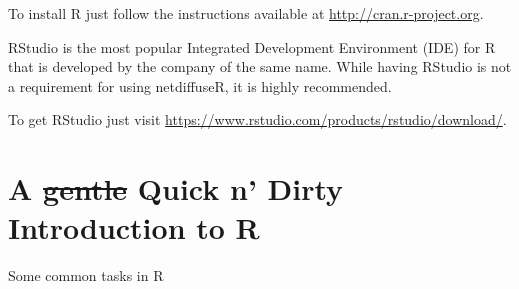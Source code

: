 \documentclass[]{book}
\begin{document}
To install R just follow the instructions available at \url{http://cran.r-project.org}.

RStudio is the most popular Integrated Development Environment (IDE) for R that is developed by the company of the same name. While having RStudio is not a requirement for using netdiffuseR, it is highly recommended.

To get RStudio just visit \url{https://www.rstudio.com/products/rstudio/download/}.

\hypertarget{a-gentle-quick-n-dirty-introduction-to-r}{%
\section{\texorpdfstring{A \sout{gentle} Quick n' Dirty Introduction to R}{A gentle Quick n' Dirty Introduction to R}}\label{a-gentle-quick-n-dirty-introduction-to-r}}

Some common tasks in R
\end{document}
